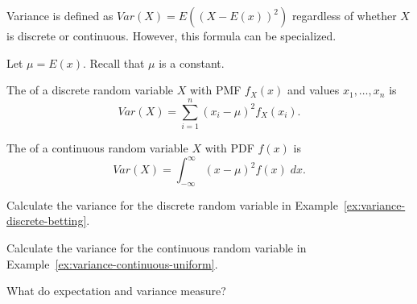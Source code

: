 \documentclass[../main.tex]{subfiles}
\begin{document}
Variance is defined as \(Var(X) = E( (X - E(x))^{2} )\) regardless of whether \(X\) is discrete or continuous. However, this formula can be specialized.  
\begin{definition}[variance]
  Let \(\mu = E(x)\). Recall that \(\mu\) is a constant.

  The  of a discrete random variable \(X\) with PMF \(f_{X}(x)\) and values \(x_{1}, \ldots, x_{n}\) is 
  \begin{equation} \label{def:variance-discrete}
    Var(X) = \sum_{i=1}^{n} (x_{i} - \mu)^{2} f_{X}(x_{i}).
  \end{equation}

  The  of a continuous random variable \(X\) with PDF \(f(x)\) is 
  \begin{equation} \label{def:variance-continuous}
    Var(X) = \int_{-\infty}^{\infty} (x - \mu)^{2} f(x) \;dx.
  \end{equation}
\end{definition}

\begin{example}
  Calculate the variance for the discrete random variable in Example~\ref{ex:variance-discrete-betting}.

\end{example}

\begin{example}
  Calculate the variance for the continuous random variable in Example~\ref{ex:variance-continuous-uniform}.

\end{example}
\clearpage

What do expectation and variance measure?
\end{document}
